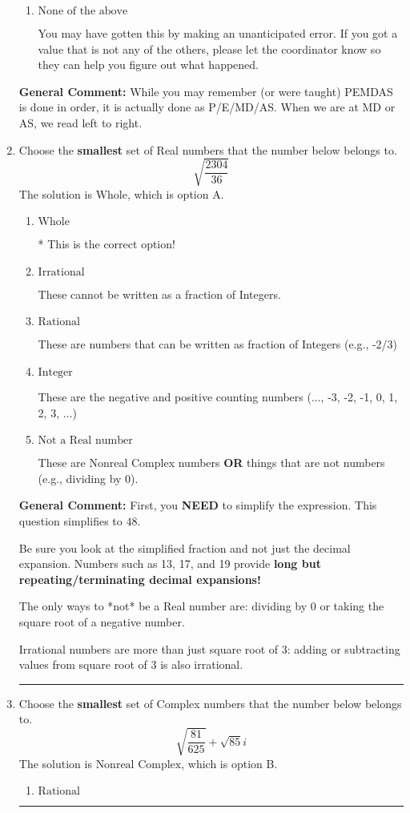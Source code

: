 \documentclass{extbook}[14pt]
\newcommand{\litem}[1]{\item #1

\rule{\textwidth}{0.4pt}}
\begin{document}
\begin{enumerate}
{\begin{enumerate}[label=\Alph*.]
 124.943, which corresponds to not distributing addition and subtraction correctly.
\item \( \text{None of the above} \)

 You may have gotten this by making an unanticipated error. If you got a value that is not any of the others, please let the coordinator know so they can help you figure out what happened.
\end{enumerate}

\textbf{General Comment:} While you may remember (or were taught) PEMDAS is done in order, it is actually done as P/E/MD/AS. When we are at MD or AS, we read left to right.
}
\litem{
Choose the \textbf{smallest} set of Real numbers that the number below belongs to.
\[ \sqrt{\frac{2304}{36}} \]
The solution is \( \text{Whole} \), which is option A.\begin{enumerate}[label=\Alph*.]
\item \( \text{Whole} \)

* This is the correct option!
\item \( \text{Irrational} \)

These cannot be written as a fraction of Integers.
\item \( \text{Rational} \)

These are numbers that can be written as fraction of Integers (e.g., -2/3)
\item \( \text{Integer} \)

These are the negative and positive counting numbers (..., -3, -2, -1, 0, 1, 2, 3, ...)
\item \( \text{Not a Real number} \)

These are Nonreal Complex numbers \textbf{OR} things that are not numbers (e.g., dividing by 0).
\end{enumerate}

\textbf{General Comment:} First, you \textbf{NEED} to simplify the expression. This question simplifies to $48$. 
 
 Be sure you look at the simplified fraction and not just the decimal expansion. Numbers such as 13, 17, and 19 provide \textbf{long but repeating/terminating decimal expansions!} 
 
 The only ways to *not* be a Real number are: dividing by 0 or taking the square root of a negative number. 
 
 Irrational numbers are more than just square root of 3: adding or subtracting values from square root of 3 is also irrational.
}
\litem{
Choose the \textbf{smallest} set of Complex numbers that the number below belongs to.
\[ \sqrt{\frac{81}{625}}+\sqrt{85} i \]
The solution is \( \text{Nonreal Complex} \), which is option B.\begin{enumerate}[label=\Alph*.]
\item \( \text{Rational} \)


\end{enumerate}}
\end{enumerate}
\end{document}
